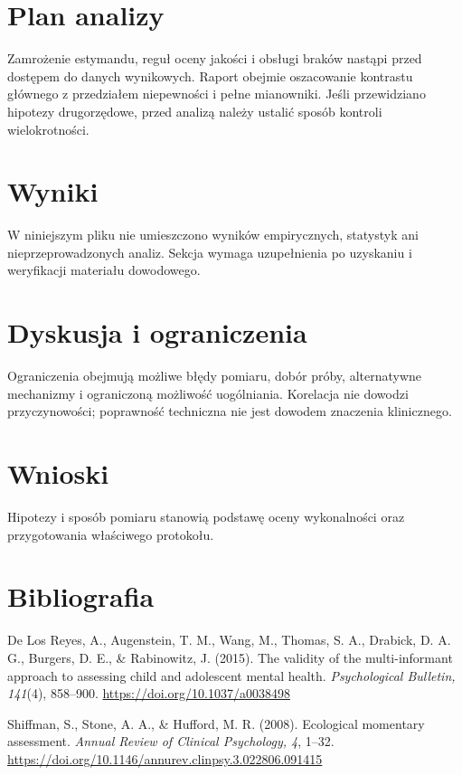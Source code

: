 \documentclass[11pt,a4paper]{article}
\begin{document}
\section{Plan analizy}

Zamrożenie estymandu, reguł oceny jakości i obsługi braków nastąpi przed dostępem do danych wynikowych. Raport obejmie oszacowanie kontrastu głównego z przedziałem niepewności i pełne mianowniki. Jeśli przewidziano hipotezy drugorzędowe, przed analizą należy ustalić sposób kontroli wielokrotności.

\section{Wyniki}

W niniejszym pliku nie umieszczono wyników empirycznych, statystyk ani nieprzeprowadzonych analiz. Sekcja wymaga uzupełnienia po uzyskaniu i weryfikacji materiału dowodowego.

\section{Dyskusja i ograniczenia}

Ograniczenia obejmują możliwe błędy pomiaru, dobór próby, alternatywne mechanizmy i ograniczoną możliwość uogólniania. Korelacja nie dowodzi przyczynowości; poprawność techniczna nie jest dowodem znaczenia klinicznego.

\section{Wnioski}

Hipotezy i sposób pomiaru stanowią podstawę oceny wykonalności oraz przygotowania właściwego protokołu.

\section*{Bibliografia}

{\setlength{\parindent}{0pt}
\setlength{\parskip}{5pt}
\hangindent=1.27cm
De Los Reyes, A., Augenstein, T. M., Wang, M., Thomas, S. A., Drabick, D. A. G., Burgers, D. E., \& Rabinowitz, J. (2015). The validity of the multi-informant approach to assessing child and adolescent mental health. \textit{Psychological Bulletin, 141}(4), 858--900. \url{https://doi.org/10.1037/a0038498}\par
\hangindent=1.27cm
Shiffman, S., Stone, A. A., \& Hufford, M. R. (2008). Ecological momentary assessment. \textit{Annual Review of Clinical Psychology, 4}, 1--32. \url{https://doi.org/10.1146/annurev.clinpsy.3.022806.091415}\par
}
\end{document}
